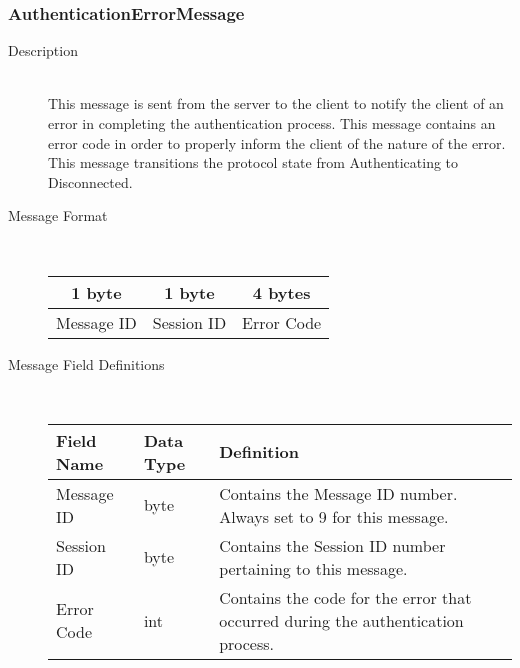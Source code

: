 \documentclass[12pt,letterpaper,titlepage]{article}
\begin{document}
\subsubsection{AuthenticationErrorMessage}
	\begin{description}
	\item[Description] \hfill \\
		This message is sent from the server to the client to notify the client of an error in 
		completing the authentication process. This message contains an error code in order to 
		properly inform the client of the nature of the error. This message transitions the protocol
		state from Authenticating to Disconnected.
	\item[Message Format] \hfill \\
	\begin{tabular}{ | c | c | c | }
		\hline
		1 byte & 1 byte & 4 bytes \\
		\hline
		Message ID & Session ID & Error Code \\
		\hline
	\end{tabular}
	\item[Message Field Definitions] \hfill \\
	\begin{tabular}{ | p{3cm} | p{1.5cm} | p{8cm} | }
		\hline
		Field Name & Data Type & Definition \\
		\hline
		Message ID & byte & Contains the Message ID number. 
					\newline Always set to 9 for this message. \\
		\hline
		Session ID & byte & Contains the Session ID number pertaining to this message. \\
		\hline
		Error Code & int & Contains the code for the error that occurred during the authentication process. \\
		\hline
	\end{tabular}
	\end{description}	
\end{document}

